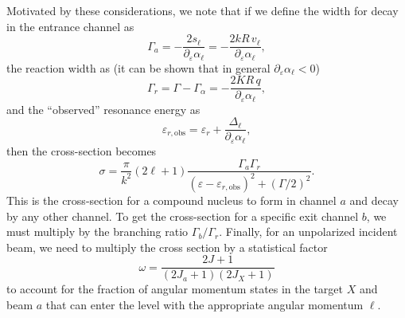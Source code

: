 Motivated by these considerations, we note that
if we define the width for decay in the entrance channel as
\begin{equation}\label{e.Gamma-entrance}
\Gamma_{a} = -\frac{2s_{\ell}}{\partial_{\varepsilon}\alpha_{\ell}} = -\frac{2kR\,v_{\ell}}{\partial_{\varepsilon}\alpha_{\ell}},
\end{equation}
the reaction width as (it can be shown that in general $\partial_{\varepsilon}\alpha_{\ell} < 0$)
\begin{equation}\label{e.Gamma-reaction}
\Gamma_{r} = \Gamma-\Gamma_{\alpha} = -\frac{2KR\,q}{\partial_{\varepsilon}\alpha_{\ell}},
\end{equation}
and the ``observed'' resonance energy as 
\[
\varepsilon_{r,\mathrm{obs}} = \varepsilon_{r} + \frac{\Delta_{\ell}}{\partial_{\varepsilon}\alpha_{\ell}},
\]
then the cross-section becomes
\begin{equation}\label{e.breit-wigner}
\sigma = \frac{\pi}{k^{2}}(2\ell + 1)\frac{\Gamma_{a}\Gamma_{r}}{(\varepsilon - \varepsilon_{r,\mathrm{obs}})^{2} + (\Gamma/2)^{2}}.
\end{equation}
This is the cross-section for a compound nucleus to form in channel $a$ and decay by any other channel.  To get the cross-section for a specific exit channel $b$, we must multiply by the branching ratio $\Gamma_{b}/\Gamma_{r}$.  Finally, for an unpolarized incident beam, we need to multiply the cross section by a statistical factor
\begin{equation}\label{e.stat-factor}
\omega = \frac{2J + 1}{(2J_{a}+1)(2J_{X}+1)}
\end{equation}
to account for the fraction of angular momentum states in the target $X$ and beam $a$ that can enter the level with the appropriate angular momentum $\ell$.

